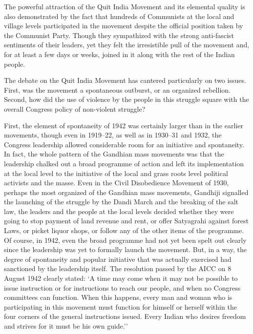 \begin{multicols}{2}
The powerful attraction of the Quit India Movement and its elemental quality is also demonstrated by the fact that hundreds of Communists at the local and village levels participated in the movement despite the official position taken by the Communist Party. Though they sympathized with the strong anti-fascist sentiments of their leaders, yet they felt the irresistible pull of the movement and, for at least a few days or weeks, joined in it along with the rest of the Indian people.

The debate on the Quit India Movement has cantered particularly on two issues. First, was the movement a spontaneous outburst, or an organized rebellion. Second, how did the use of violence by the people in this struggle square with the overall Congress policy of non-violent struggle?

First, the element of spontaneity of 1942 was certainly larger than in the earlier movements, though even in 1919--22, as well as in 1930--31 and 1932, the Congress leadership allowed considerable room for an initiative and spontaneity. In fact, the whole pattern of the Gandhian mass movements was that the leadership chalked out a broad programme of action and left its implementation at the local level to the initiative of the local and grass roots level political activists and the masse. Even in the Civil Disobedience Movement of 1930, perhaps the most organized of the Gandhian mass movements, Gandhiji signalled the launching of the struggle by the Dandi March and the breaking of the salt law, the leaders and the people at the local levels decided whether they were going to stop payment of land revenue and rent, or offer Satyagrahi against forest Laws, or picket liquor shops, or follow any of the other items of the programme. Of course, in 1942, even the broad programme had not yet been spelt out clearly since the leadership was yet to formally launch the movement. But, in a way, the degree of spontaneity and popular initiative that was actually exercised had sanctioned by the leadership itself. The resolution passed by the AICC on 8 August 1942 clearly stated: `A time may come when it may not be possible to issue instruction or for instructions to reach our people, and when no Congress committees can function. When this happens, every man and woman who is participating in this movement must function for himself or herself within the four corners of the general instructions issued. Every Indian who desires freedom and strives for it must be his own guide.''


\end{multicols}
